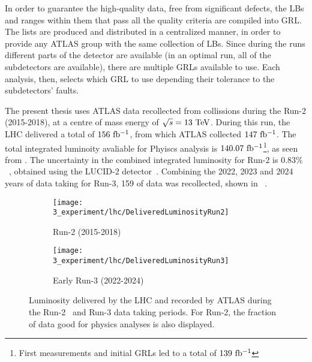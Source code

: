 In order to guarantee the high-quality data, free from significant defects, the \acp{LB} and ranges within them that pass all the quality criteria are compiled into \ac{GRL}. The lists are produced and distributed in a centralized manner, in order to provide any \ac{ATLAS} group with the same collection of \acp{LB}. Since during the runs different parts of the detector are available (in an optimal run, all of the subdetectors are available), there are multiple \acp{GRL} available to use. Each analysis, then, selects which \ac{GRL} to use depending their tolerance to the subdetectors' faults.

The present thesis uses \ac{ATLAS} data recollected from \pp collissions during the Run-2 (2015-2018), at a centre of mass energy of \(\sqrt{s} = 13~\tev\). During this run, the \ac{LHC} delivered a total of \(156~\ifb\), from which \ac{ATLAS} collected \(147~\ifb\). The total integrated luminoity avaliable for Phyiscs analysis is \(140.07~\ifb\)\footnote{First measurements and initial \acp{GRL} led to a total of \(139~\ifb\)}, as seen from \Fig{\ref{fig:atlas:runs:lumi_run2}}. The uncertainty in the combined integrated luminosity for Run-2 is \(0.83\%\)~\cite{ATLAS-Lumi-Run2}, obtained using the LUCID-2 detector~\cite{ATLAS-LUCID2}.
Combining the 2022, 2023 and 2024 years of data taking for Run-3, 159 \ifb of data was recollected, shown in \Fig{\ref{fig:atlas:runs:lumi_run3}}~\cite{ATLAS-Lumi-Run3-2022,ATLAS-Lumi-Run3-2023}.

\begin{figure}[ht!]
    \centering
    \begin{subfigure}[h]{0.49\linewidth}
        \centering
        \texttt{[image: 3\_experiment/lhc/DeliveredLuminosityRun2]}
        \caption{Run-2 (2015-2018)}
        \label{fig:atlas:runs:lumi_run2}
    \end{subfigure}
    \hfill
    \begin{subfigure}[h]{0.49\linewidth}
        \centering
        \texttt{[image: 3\_experiment/lhc/DeliveredLuminosityRun3]}
        \caption{Early Run-3 (2022-2024)}
        \label{fig:atlas:runs:lumi_run3}
    \end{subfigure}
    \caption{Luminosity delivered by the \ac{LHC} and recorded by \ac{ATLAS} during the Run-2~\cite{ATLAS-Lumi-Run2} and Run-3 data taking periods. For Run-2, the fraction of data good for physics analyses is also displayed.}
    \label{fig:atlas:runs:lumi}
\end{figure}

